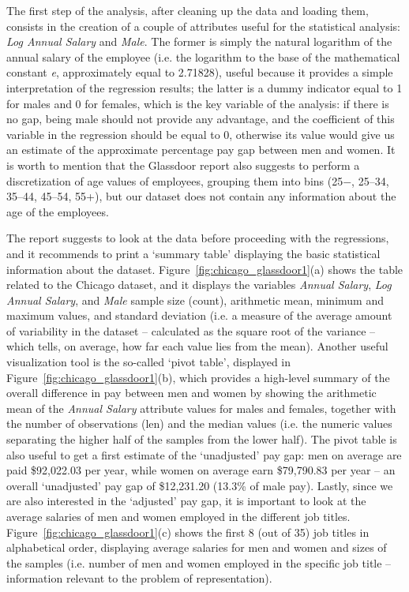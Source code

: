 The first step of the analysis, after cleaning up the data and loading them, consists in the creation of a couple of attributes useful for the statistical analysis: \textit{Log Annual Salary} and \textit{Male}. The former is simply the natural logarithm of the annual salary of the employee (i.e. the logarithm to the base of the mathematical constant \textit{e}, approximately equal to 2.71828), useful because it provides a simple interpretation of the regression results; the latter is a dummy indicator equal to 1 for males and 0 for females, which is the key variable of the analysis: if there is no gap, being male should not provide any advantage, and the coefficient of this variable in the regression should be equal to 0, otherwise its value would give us an estimate of the approximate percentage pay gap between men and women. It is worth to mention that the Glassdoor report also suggests to perform a discretization of age values of employees, grouping them into bins (25\(-\), 25--34, 35--44, 45--54, 55+), but our dataset does not contain any information about the age of the employees.

The report suggests to look at the data before proceeding with the regressions, and it recommends to print a `summary table' displaying the basic statistical information about the dataset. Figure~\ref{fig:chicago_glassdoor1}(a) shows the table related to the Chicago dataset, and it displays the variables \textit{Annual Salary}, \textit{Log Annual Salary}, and \textit{Male} sample size (count), arithmetic mean, minimum and maximum values, and standard deviation (i.e. a measure of the average amount of variability in the dataset -- calculated as the square root of the variance -- which tells, on average, how far each value lies from the mean).
Another useful visualization tool is the so-called `pivot table', displayed in Figure~\ref{fig:chicago_glassdoor1}(b), which provides a high-level summary of the overall difference in pay between men and women by showing the arithmetic mean of the \textit{Annual Salary} attribute values for males and females, together with the number of observations (len) and the median values (i.e. the numeric values separating the higher half of the samples from the lower half). The pivot table is also useful to get a first estimate of the `unadjusted' pay gap: men on average are paid \$92,022.03 per year, while women on average earn \$79,790.83 per year -- an overall `unadjusted' pay gap of \$12,231.20 (13.3\% of male pay).
Lastly, since we are also interested in the `adjusted' pay gap, it is important to look at the average salaries of men and women employed in the different job titles. Figure~\ref{fig:chicago_glassdoor1}(c) shows the first 8 (out of 35) job titles in alphabetical order, displaying average salaries for men and women and sizes of the samples (i.e. number of men and women employed in the specific job title -- information relevant to the problem of representation).

